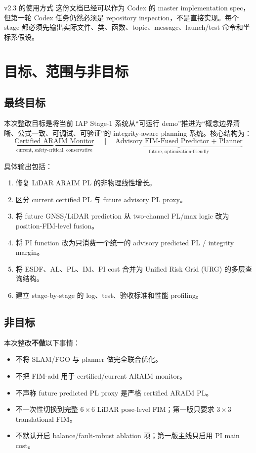 \documentclass[11pt,a4paper]{article}
\begin{document}
\begin{acceptbox}{v2.3 的使用方式}
  这份文档已经可以作为 Codex 的 master implementation spec，但第一轮 Codex 任务仍然必须是 repository inspection，不是直接实现。每个 stage 都必须先输出实际文件、类、函数、topic、message、launch/test 命令和坐标系假设。
\end{acceptbox}

\section{目标、范围与非目标}

\subsection{最终目标}

本次整改目标是将当前 IAP Stage-1 系统从“可运行 demo”推进为“概念边界清晰、公式一致、可调试、可验证”的 integrity-aware planning 系统。核心结构为：
\[
  \boxed{
    \underbrace{\text{Certified ARAIM Monitor}}_{\text{current, safety-critical, conservative}}
    \quad \parallel \quad
    \underbrace{\text{Advisory FIM-Fused Predictor + Planner}}_{\text{future, optimization-friendly}}
  }
\]

\noindent 具体输出包括：
\begin{enumerate}
  \item 修复 LiDAR ARAIM PL 的非物理线性增长。
  \item 区分 current certified PL 与 future advisory PL proxy。
  \item 将 future GNSS/LiDAR prediction 从 two-channel PL/max logic 改为 position-FIM-level fusion。
  \item 将 PI function 改为只消费一个统一的 advisory predicted PL / integrity margin。
  \item 将 ESDF、AL、PL、IM、PI cost 合并为 Unified Risk Grid (URG) 的多层查询结构。
  \item 建立 stage-by-stage 的 log、test、验收标准和性能 profiling。
\end{enumerate}

\subsection{非目标}

本次整改\textbf{不做}以下事情：
\begin{itemize}
  \item 不将 SLAM/FGO 与 planner 做完全联合优化。
  \item 不把 FIM-add 用于 certified/current ARAIM monitor。
  \item 不声称 future predicted PL proxy 是严格 certified ARAIM PL。
  \item 不一次性切换到完整 $6\times 6$ LiDAR pose-level FIM；第一版只要求 $3\times 3$ translational FIM。
  \item 不默认开启 balance/fault-robust ablation 项；第一版主线只启用 PI main cost。
\end{itemize}
\end{document}
